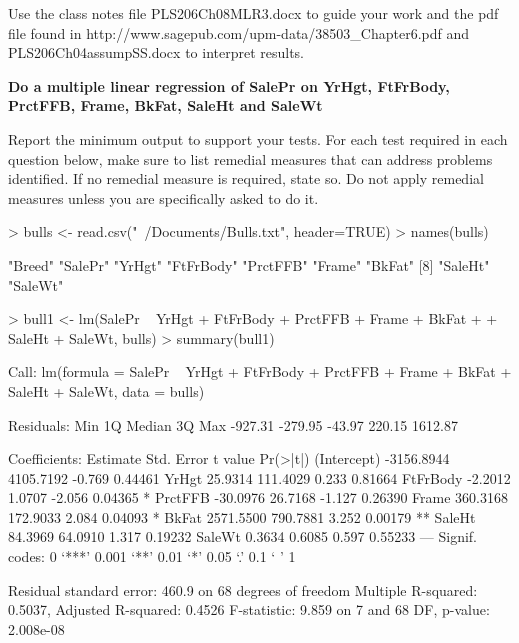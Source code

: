\documentclass[letterpaper]{article}
\newcounter{qcounter}
\begin{document}
Use the class notes file PLS206Ch08MLR3.docx to guide your work and the pdf file found in http://www.sagepub.com/upm-data/38503_Chapter6.pdf and PLS206Ch04assumpSS.docx to interpret results.
\begin{list}{ \bf {}. }{}


{\item \bf Do a multiple linear regression of SalePr on YrHgt, FtFrBody, PrctFFB, Frame, BkFat, SaleHt and SaleWt}

Report the minimum output to support your tests. For each test required in each question below, make sure to list remedial measures that can address problems identified. If no remedial measure is required, state so. Do not  apply remedial measures unless you are specifically asked to do it.

\begin{Schunk}
\begin{Sinput}
> bulls <- read.csv("~/Documents/Bulls.txt", header=TRUE)
> names(bulls)
\end{Sinput}
\begin{Soutput}
[1] "Breed"    "SalePr"   "YrHgt"    "FtFrBody" "PrctFFB"  "Frame"    "BkFat"   
[8] "SaleHt"   "SaleWt"  
\end{Soutput}
\begin{Sinput}
> bull1 <- lm(SalePr ~ YrHgt + FtFrBody + PrctFFB + Frame + BkFat
+             + SaleHt + SaleWt, bulls)
> summary(bull1)
\end{Sinput}
\begin{Soutput}
Call:
lm(formula = SalePr ~ YrHgt + FtFrBody + PrctFFB + Frame + BkFat + 
    SaleHt + SaleWt, data = bulls)

Residuals:
    Min      1Q  Median      3Q     Max 
-927.31 -279.95  -43.97  220.15 1612.87 

Coefficients:
              Estimate Std. Error t value Pr(>|t|)   
(Intercept) -3156.8944  4105.7192  -0.769  0.44461   
YrHgt          25.9314   111.4029   0.233  0.81664   
FtFrBody       -2.2012     1.0707  -2.056  0.04365 * 
PrctFFB       -30.0976    26.7168  -1.127  0.26390   
Frame         360.3168   172.9033   2.084  0.04093 * 
BkFat        2571.5500   790.7881   3.252  0.00179 **
SaleHt         84.3969    64.0910   1.317  0.19232   
SaleWt          0.3634     0.6085   0.597  0.55233   
---
Signif. codes:  0 ‘***’ 0.001 ‘**’ 0.01 ‘*’ 0.05 ‘.’ 0.1 ‘ ’ 1

Residual standard error: 460.9 on 68 degrees of freedom
Multiple R-squared:  0.5037,	Adjusted R-squared:  0.4526 
F-statistic: 9.859 on 7 and 68 DF,  p-value: 2.008e-08
\end{Soutput}
\end{Schunk}


\end{list}
\end{document}

